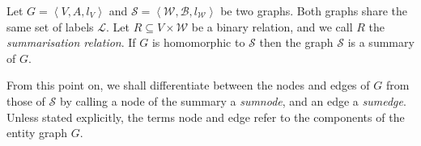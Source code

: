 \begin{definition}
	Let $G=\left\langle V, A, l_V \right\rangle$ and $\mathcal{S}=\left\langle \mathcal{W}, \mathcal{B}, l_\mathcal{W} \right\rangle$ be two graphs. Both graphs share the same set of labels $\mathcal{L}$. Let $R \subseteq V \times \mathcal{W}$ be a binary relation, and we call $R$ the \emph{summarisation relation}.
	If $G$ is homomorphic to $\mathcal{S}$ then the graph $\mathcal{S}$ is a summary of $G$.
\end{definition}

\begin{remark}
From this point on, we shall differentiate between the nodes and edges of $G$ from those of $\mathcal{S}$ by calling a node of the summary a \emph{sumnode}, and an edge a \emph{sumedge}. Unless stated explicitly, the terms node and edge refer to the components of the entity graph $G$.
\end{remark}



%

